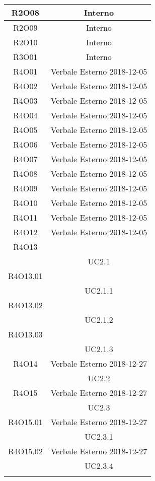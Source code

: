 \begin{tabularx}{\textwidth}{|C|C|}
	\hline
	R2O08&Interno\\
	\hline
	R2O09&Interno\\
	\hline
	R2O10&Interno\\
	\hline
	R3O01&Interno\\
	\hline
	R4O01&Verbale Esterno 2018-12-05\\
	\hline
	R4O02&Verbale Esterno 2018-12-05\\
	\hline
	R4O03&Verbale Esterno 2018-12-05\\
	\hline
	R4O04&Verbale Esterno 2018-12-05\\
	\hline
	R4O05&Verbale Esterno 2018-12-05\\
	\hline
	R4O06&Verbale Esterno 2018-12-05\\
	\hline
	R4O07&Verbale Esterno 2018-12-05\\
	\hline
	R4O08&Verbale Esterno 2018-12-05\\
	\hline
	R4O09&Verbale Esterno 2018-12-05\\
	\hline
	R4O10&Verbale Esterno 2018-12-05\\
	\hline
	R4O11&Verbale Esterno 2018-12-05\\
	\hline
	R4O12&Verbale Esterno 2018-12-05\\
	\hline
	R4O13&\\& UC2.1\\
	\hline
	R4O13.01&\\&UC2.1.1\\
	\hline
	R4O13.02&\\& UC2.1.2\\
	\hline
	R4O13.03&\\&UC2.1.3\\
	\hline
	R4O14&Verbale Esterno 2018-12-27\\&UC2.2\\
	\hline
	R4O15&Verbale Esterno 2018-12-27\\&UC2.3\\
	\hline
	R4O15.01&Verbale Esterno 2018-12-27\\&UC2.3.1\\
	\hline
	R4O15.02&Verbale Esterno 2018-12-27\\&UC2.3.4\\
	\hline
	\caption{Tabella requisiti-fonti}
\end{tabularx}


\newpage
